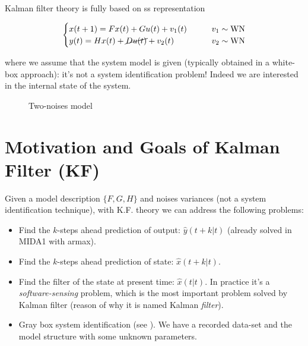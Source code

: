 Kalman filter theory is fully based on \acrfull{ss} representation

\[
    \begin{cases}
        x(t+1) = Fx(t) + Gu(t) + v_1(t)  & \qquad v_1 \sim \operatorname{WN} \\
        y(t) = Hx(t) + \cancel{Du(t)} + v_2(t) & \qquad v_2 \sim \operatorname{WN}
    \end{cases}
\]

where we assume that the system model is given (typically obtained in a white-box approach): it's not a system identification problem! Indeed we are interested in the internal state of the system.

\begin{figure}[H]
    \centering
    \caption*{Two-noises model}
\end{figure}


\section{Motivation and Goals of Kalman Filter (KF)}

Given a model description $\{F, G, H\}$ and noises variances (not a system identification technique), with K.F. theory we can address the following problems:

\begin{itemize}
    \item Find the $k$-steps ahead prediction of output: $\hat{y}(t+k|t)$ (already solved in MIDA1 with \gls{armax}).
    \item Find the $k$-steps ahead prediction of state: $\hat{x}(t+k|t)$.
    \item Find the filter of the state at present time: $\hat{x}(t|t)$. In practice it's a \emph{software-sensing} problem, which is the most important problem solved by Kalman filter (reason of why it is named Kalman \emph{filter}).
    \item Gray box system identification (see ). We have a recorded data-set and the model structure with some unknown parameters.
\end{itemize}


